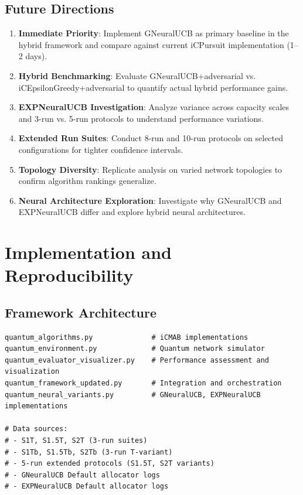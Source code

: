 \documentclass[12pt,a4paper]{article}
\begin{document}
\subsection{Future Directions}
\begin{enumerate}
\item \textbf{Immediate Priority}: Implement GNeuralUCB as primary baseline in the hybrid framework and compare against current iCPursuit implementation (1--2 days).
\item \textbf{Hybrid Benchmarking}: Evaluate GNeuralUCB+adversarial vs. iCEpsilonGreedy+adversarial to quantify actual hybrid performance gains.
\item \textbf{EXPNeuralUCB Investigation}: Analyze variance across capacity scales and 3-run vs. 5-run protocols to understand performance variations.
\item \textbf{Extended Run Suites}: Conduct 8-run and 10-run protocols on selected configurations for tighter confidence intervals.
\item \textbf{Topology Diversity}: Replicate analysis on varied network topologies to confirm algorithm rankings generalize.
\item \textbf{Neural Architecture Exploration}: Investigate why GNeuralUCB and EXPNeuralUCB differ and explore hybrid neural architectures.
\end{enumerate}

\section{Implementation and Reproducibility}

\subsection{Framework Architecture}
\begin{lstlisting}[caption=Core iCMAB and Neural Framework Components]
quantum_algorithms.py              # iCMAB implementations
quantum_environment.py             # Quantum network simulator
quantum_evaluator_visualizer.py    # Performance assessment and visualization
quantum_framework_updated.py       # Integration and orchestration
quantum_neural_variants.py         # GNeuralUCB, EXPNeuralUCB implementations

# Data sources:
# - S1T, S1.5T, S2T (3-run suites)
# - S1Tb, S1.5Tb, S2Tb (3-run T-variant)
# - 5-run extended protocols (S1.5T, S2T variants)
# - GNeuralUCB Default allocator logs
# - EXPNeuralUCB Default allocator logs
\end{lstlisting}
\end{document}
